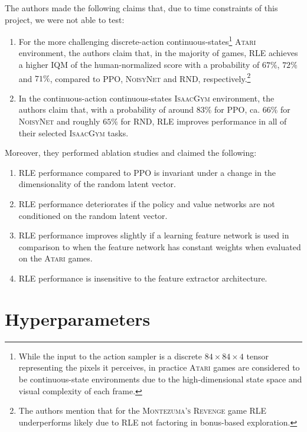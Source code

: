 \noindent The authors made the following claims that, due to time constraints of this project, we were not able to test:

\begin{enumerate}
  \item For the more challenging discrete-action continuous-states\footnote{While the input to the action sampler is a discrete $84\times84\times4$ tensor representing the pixels it perceives, in practice \textsc{Atari} games are considered to be continuous-state environments due to the high-dimensional state space and visual complexity of each frame.} \textsc{Atari} environment, the authors claim that, in the majority of games, \textsc{RLE} achieves a higher IQM of the human-normalized score with a probability of $67\%$, $72\%$ and $71\%$, compared to \textsc{PPO}, \textsc{NoisyNet} and \textsc{RND}, respectively.\footnote{The authors mention that for the \textsc{Montezuma's Revenge} game \textsc{RLE} underperforms likely due to \textsc{RLE} not factoring in bonus-based exploration.}
  \item In the continuous-action continuous-states \textsc{IsaacGym} environment, the authors claim that, with a probability of around $83\%$ for \textsc{PPO}, ca. $66\%$ for \textsc{NoisyNet} and roughly $65\%$ for \textsc{RND}, \textsc{RLE} improves performance in all of their selected \textsc{IsaacGym} tasks.
\end{enumerate}

\noindent Moreover, they performed ablation studies and claimed the following:

\begin{enumerate}
  \item \textsc{RLE} performance compared to \textsc{PPO} is invariant under a change in the dimensionality of the random latent vector.
  \item \textsc{RLE} performance deteriorates if the policy and value networks are not conditioned on the random latent vector.
  \item \textsc{RLE} performance improves slightly if a learning feature network is used in comparison to when the feature network has constant weights when evaluated on the \textsc{Atari} games.
  \item \textsc{RLE} performance is insensitive to the feature extractor architecture.
\end{enumerate}

\clearpage
\hypertarget{appendix-hyperparams}{\section{Hyperparameters}}

